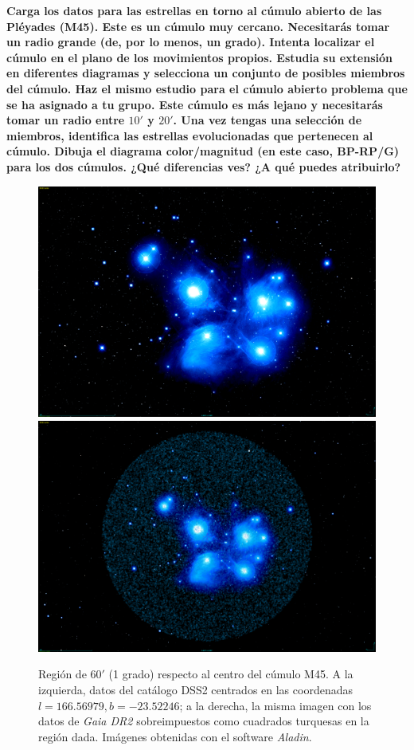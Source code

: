 \documentclass[a4paper,fleqn,usenatbib]{mnras}
\begin{document}
\textbf{Carga los datos para las estrellas en torno al cúmulo abierto de las Pléyades (M45). Este es un cúmulo muy
cercano. Necesitarás tomar un radio grande (de, por lo menos, un grado). Intenta localizar el cúmulo en el
plano de los movimientos propios. Estudia su extensión en diferentes diagramas y selecciona un conjunto de
posibles miembros del cúmulo. Haz el mismo estudio para el cúmulo abierto problema que se ha asignado a tu grupo. Este cúmulo es más lejano y necesitarás tomar un radio entre $10'$ y $20'$. Una vez tengas una selección de miembros, identifica las estrellas evolucionadas que pertenecen al cúmulo. Dibuja el diagrama color/magnitud (en este caso, BP-RP/G) para los dos cúmulos. ¿Qué diferencias ves? ¿A qué puedes atribuirlo?}

\begin{figure}
  \includegraphics[width=0.49\linewidth]{img/pleyades}
  \includegraphics[width=0.49\linewidth]{img/pleyades_gaia}
  \caption{Región de $60'$ (1 grado) respecto al centro del cúmulo M45. A la izquierda, datos del catálogo \ac{DSS2} centrados en las coordenadas $l=166.56979, b=-23.52246$; a la derecha, la misma imagen con los datos de \emph{Gaia DR2} sobreimpuestos como cuadrados turquesas en la región dada. Imágenes obtenidas con el software \emph{Aladin}.}
\end{figure}
\end{document}
